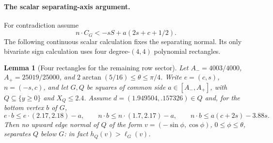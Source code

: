 \documentclass[11pt]{article}
\newtheorem{lemma}[theorem]{Lemma}
\begin{document}
\paragraph{The scalar separating-axis argument.}
For contradiction assume
\begin{equation}\label{eq:scalar-early-row-failure}
 n\cdot C_G<-sS+a(2s+c+1/2).
\end{equation}
The following continuous scalar calculation fixes the separating normal.
Its only bivariate sign calculation uses four degree-$(4,4)$ polynomial
rectangles.
\begin{lemma}[Four rectangles for the remaining row sector]
Let $A_-=4003/4000$, $A_+=25019/25000$, and
$2\arctan(5/16)\le\theta\le\pi/4$.
Write $e=(c,s)$, $n=(-s,c)$, and let $G,Q$ be squares of common
side $a\in[A_-,A_+]$, with $Q\subseteq\{y\ge0\}$ and $X_Q\le2.4$.
Assume $d=(1.949504,.157326)\in Q$ and, for the bottom vertex $b$ of $G$,
\[
 e\cdot b\le e\cdot(2.17,2.18)-a,\qquad
 n\cdot b\le n\cdot(1.7,2.17)-a,\qquad
 n\cdot b\le a(c+2s)-3.88s.
\]
Then no upward edge normal of $Q$ of the form
$v=(-\sin\phi,\cos\phi)$, $0\le\phi\le\theta$, separates $Q$
below $G$: in fact $h_Q(v)>\ell_G(v)$.
\end{lemma}
\end{document}
